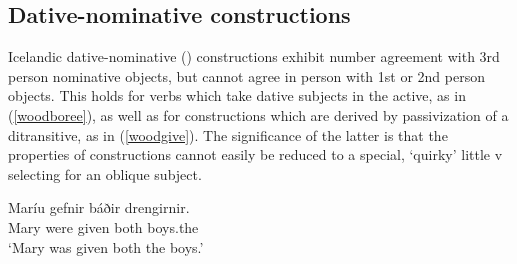 \documentclass[output=paper]{langscibook}
\begin{document}

%






\subsection{Dative-nominative constructions} \label{wooddativ}

Icelandic dative-nominative (\datnomn) constructions exhibit number agreement with 3rd person nominative objects, but cannot agree in person with 1st or 2nd person objects. This holds for verbs which  take dative subjects in the active, as in (\ref{woodboree}), as well as for \datnom constructions which are derived by passivization of a ditransitive, as in (\ref{woodgive}). The significance of the latter is that the properties of \datnom constructions cannot easily be reduced to a special, `quirky' little v selecting for an oblique subject.

\ea \label{woodgive}
\ea[]%
{
    \gll Maríu  gefnir báðir drengirnir. \\
        Mary\dat{} were given both boys.the\nom{} \\
    \glt `Mary was given both the boys.'
}
\z
{} %
\z
\end{document}
